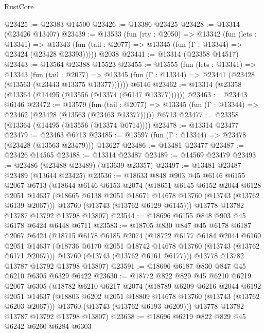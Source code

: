 \begin{lexlean}{RustCore}
\begin{coremodule}
@23425 := @23383 @14500
@23426 := @13386 @23425
@23428 := @13314 (@23426 @13407)
@23439 := @13533
    (fun (rty : @2050) =>
    @13342
      (fun (lets : @13341) =>
      @13343 (fun (tail : @2077) => @13345 (fun (Γ : @13344) => @23424 (@23428 @23393)))))
    @2038
@23441 := @13314 (@23358 @14517)
@23443 := @13564 @23388 @15523
@23455 := @13555
    (fun (lets : @13341) =>
    @13343
      (fun (tail : @2077) =>
      @13345 (fun (Γ : @13344) => @23441 (@23428 (@13563 (@23443 @13375 @13377))))))
    @6146
@23462 := @13314 (@23358 (@13364 (@14495 (@13556 (@13374 (@6147 @13377))))))
@23463 := @23443 @6146
@23472 := @13579
    (fun (tail : @2077) => @13345 (fun (Γ : @13344) => @23462 (@23428 (@13563 (@23463 @13377)))))
    @6713
@23477 := @23358 (@13364 (@14495 (@13556 (@13374 @6714))))
@23478 := @13314 @23477
@23479 := @23463 @6713
@23485 := @13597 (fun (Γ : @13344) => @23478 (@23428 (@13563 @23479))) @13627
@23486 := @13481 @23477
@23487 := @23426 @14565
@23488 := @13314 @23487
@23489 := @14569 @23479
@23493 := @23486 (@23488 @23489) (@13639 @23357)
@23497 := @13481 @23487 @23489 (@13644 @23425)
@23536 := @18633
    @848
    @903
    @45
    @6146
    @6155
    @2067
    @6713
    (@18644
      @6146
      @6153
      @2074
      (@18651
        @6145
        @6152
        @2044
        @6128
        @2051
        @14637
        (@18665 @6138 @2051 @18671 @14678 @13760 (@13743 (@13762 @6139 @2067)))
        @13760
        (@13743 (@13762 @6129 @6145)))
      @13778
      @13782
      @13787
      @13792
      @13798
      @13807)
@23544 := @18696 @6155 @848 @903 @45 @6178 @6424 @6448 @6711
@23583 := @18705
    @830
    @847
    @45
    @6178
    @6187
    @2067
    @6424
    (@18715
      @6178
      @6185
      @2074
      (@18722
        @6177
        @6184
        @2044
        @6160
        @2051
        @14637
        (@18736 @6170 @2051 @18742 @14678 @13760 (@13743 (@13762 @6171 @2067)))
        @13760
        (@13743 (@13762 @6161 @6177)))
      @13778
      @13782
      @13787
      @13792
      @13798
      @13807)
@23591 := @18696 @6187 @830 @847 @45 @6210 @6305 @6329 @6422
@23630 := @18772
    @822
    @829
    @45
    @6210
    @6219
    @2067
    @6305
    (@18782
      @6210
      @6217
      @2074
      (@18789
        @6209
        @6216
        @2044
        @6192
        @2051
        @14637
        (@18803 @6202 @2051 @18809 @14678 @13760 (@13743 (@13762 @6203 @2067)))
        @13760
        (@13743 (@13762 @6193 @6209)))
      @13778
      @13782
      @13787
      @13792
      @13798
      @13807)
@23638 := @18696 @6219 @822 @829 @45 @6242 @6260 @6284 @6303

\end{coremodule}
\end{lexlean}

